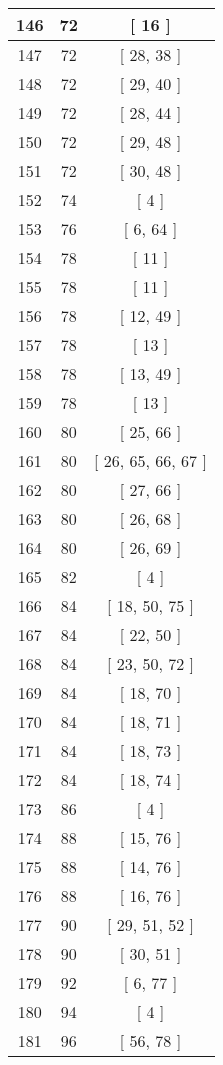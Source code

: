 \begin{center}
\begin{longtable}[H]{|| c c c ||}
\hline
146 & 72 & [ 16 ] \\ 
\hline
147 & 72 & [ 28, 38 ] \\ 
\hline
148 & 72 & [ 29, 40 ] \\ 
\hline
149 & 72 & [ 28, 44 ] \\ 
\hline
150 & 72 & [ 29, 48 ] \\ 
\hline
151 & 72 & [ 30, 48 ] \\ 
\hline
152 & 74 & [ 4 ] \\ 
\hline
153 & 76 & [ 6, 64 ] \\ 
\hline
154 & 78 & [ 11 ] \\ 
\hline
155 & 78 & [ 11 ] \\ 
\hline
156 & 78 & [ 12, 49 ] \\ 
\hline
157 & 78 & [ 13 ] \\ 
\hline
158 & 78 & [ 13, 49 ] \\ 
\hline
159 & 78 & [ 13 ] \\ 
\hline
160 & 80 & [ 25, 66 ] \\ 
\hline
161 & 80 & [ 26, 65, 66, 67 ] \\ 
\hline
162 & 80 & [ 27, 66 ] \\ 
\hline
163 & 80 & [ 26, 68 ] \\ 
\hline
164 & 80 & [ 26, 69 ] \\ 
\hline
165 & 82 & [ 4 ] \\ 
\hline
166 & 84 & [ 18, 50, 75 ] \\ 
\hline
167 & 84 & [ 22, 50 ] \\ 
\hline
168 & 84 & [ 23, 50, 72 ] \\ 
\hline
169 & 84 & [ 18, 70 ] \\ 
\hline
170 & 84 & [ 18, 71 ] \\ 
\hline
171 & 84 & [ 18, 73 ] \\ 
\hline
172 & 84 & [ 18, 74 ] \\ 
\hline
173 & 86 & [ 4 ] \\ 
\hline
174 & 88 & [ 15, 76 ] \\ 
\hline
175 & 88 & [ 14, 76 ] \\ 
\hline
176 & 88 & [ 16, 76 ] \\ 
\hline
177 & 90 & [ 29, 51, 52 ] \\ 
\hline
178 & 90 & [ 30, 51 ] \\ 
\hline
179 & 92 & [ 6, 77 ] \\ 
\hline
180 & 94 & [ 4 ] \\ 
\hline
181 & 96 & [ 56, 78 ] \\ 

\end{longtable}
\end{center}
